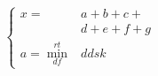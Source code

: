 \documentclass[]{article}
\begin{document}
\[\begin{aligned}
\begin{cases}
x ={}& a+b+c+\\
&d+e+f+g\\
a = \min \limits _{df}^{rt} &ddsk
\end{cases}
\end{aligned}\]
\end{document}
